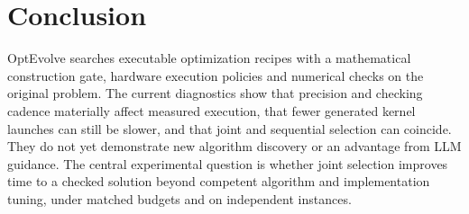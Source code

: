 \section{Conclusion}

OptEvolve searches executable optimization recipes with a mathematical
construction gate, hardware execution policies and numerical checks on the
original problem. The current diagnostics show that precision and checking
cadence materially affect measured execution, that fewer generated kernel
launches can still be slower, and that joint and sequential selection can
coincide. They do not yet demonstrate new algorithm discovery or an advantage
from LLM guidance. The central experimental question is whether joint selection
improves time to a checked solution beyond competent algorithm and
implementation tuning, under matched budgets and on independent instances.
